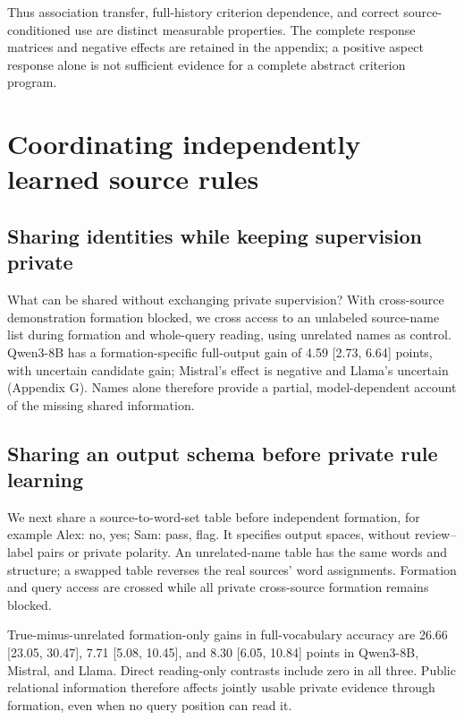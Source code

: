 \documentclass[11pt]{article}
\begin{document}
Thus association transfer, full-history criterion dependence, and correct source-conditioned use are distinct measurable properties. The complete response matrices and negative effects are retained in the appendix; a positive aspect response alone is not sufficient evidence for a complete abstract criterion program.

\section{Coordinating independently learned source rules}\label{coordinating-independently-learned-source-rules}

\subsection{Sharing identities while keeping supervision private}\label{sharing-identities-while-keeping-supervision-private}

What can be shared without exchanging private supervision? With cross-source demonstration formation blocked, we cross access to an unlabeled source-name list during formation and whole-query reading, using unrelated names as control. Qwen3-8B has a formation-specific full-output gain of 4.59 {[}2.73, 6.64{]} points, with uncertain candidate gain; Mistral's effect is negative and Llama's uncertain (Appendix G). Names alone therefore provide a partial, model-dependent account of the missing shared information.

\subsection{Sharing an output schema before private rule learning}\label{sharing-an-output-schema-before-private-rule-learning}

We next share a source-to-word-set table before independent formation, for example Alex: no, yes; Sam: pass, flag. It specifies output spaces, without review--label pairs or private polarity. An unrelated-name table has the same words and structure; a swapped table reverses the real sources' word assignments. Formation and query access are crossed while all private cross-source formation remains blocked.

True-minus-unrelated formation-only gains in full-vocabulary accuracy are 26.66 {[}23.05, 30.47{]}, 7.71 {[}5.08, 10.45{]}, and 8.30 {[}6.05, 10.84{]} points in Qwen3-8B, Mistral, and Llama. Direct reading-only contrasts include zero in all three. Public relational information therefore affects jointly usable private evidence through formation, even when no query position can read it.
\end{document}
